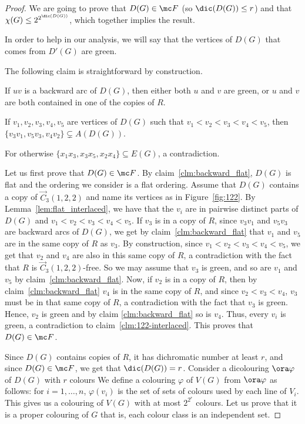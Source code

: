 \begin{proof}
We are going to prove that $D(G) \in \mc F$ (so $\dic(D(G)) \leq r$) and that $\chi(G) \leq 2^{2^{\dic(D(G))}}$, which together implies the result. 

In order to help in our analysis, we will say that the vertices of $D(G)$ that comes from $D'(G)$ are green. 

The following claim is straightforward by construction. 
\begin{claim}\label{clm:backward_flat}
If $uv$ is a backward arc of $D(G)$, then either both $u$ and $v$ are green, or $u$ and $v$ are both contained in one of the copies of $R$.
\end{claim}


\begin{claim}\label{clm:122-interlaced}
If $v_1, v_2, v_3, v_4, v_5$ are vertices of $D(G)$ such that $v_1 < v_2 < v_3 < v_4 < v_5$, then $\{v_3v_1, v_5v_3, v_4v_2\} \subsetneq A(D(G))$. 
\end{claim}
\begin{subproof}
For otherwise $\{x_1x_3, x_3x_5,x_2x_4\} \subseteq E(G)$, a contradiction. 
\end{subproof}

Let us first prove that $D(G) \in \mc F$. 
By claim~\ref{clm:backward_flat}, $D(G)$ is flat and the ordering we consider is a flat ordering. Assume that $D(G)$ contains a copy of $\vec C_{3}(1, 2, 2)$ and name its vertices as in Figure~\ref{fig:122}. 
By Lemma~\ref{lem:flat_interlaced}, we have that the $v_i$ are in pairwise distinct parts of $D(G)$ and $v_1 < v_2 < v_3 < v_4 < v_5$.  
If $v_{3}$ is in a copy of $R$, since $v_3v_{1}$ and $v_{5}v_3$ are backward arcs of $D(G)$, we get by claim~\ref{clm:backward_flat} that $v_1$ and $v_5$ are in the same copy of $R$ as $v_3$. By construction, since $v_1<v_2<v_3<v_4<v_5$, we get that $v_2$ and $v_4$ are also in this same copy of $R$, a contradiction with the fact that $R$ is $\vec C_{3}(1, 2, 2)$-free. 
So we may assume that $v_{3}$ is green, and so are $v_{1}$ and $v_{5}$ by claim~\ref{clm:backward_flat}. Now, if $v_2$ is in a copy of $R$, then by claim~\ref{clm:backward_flat} $v_4$ is in the same copy of $R$, and since $v_2 < v_3 < v_4$,   $v_3$ must be in that same copy of $R$, a contradiction with the fact that $v_3$ is green.
Hence, $v_2$ is green and by claim \ref{clm:backward_flat} so is $v_4$. Thus, every $v_i$ is green, a contradiction to claim~\ref{clm:122-interlaced}.
This proves that $D(G) \in \mc F$. 
\smallskip

Since  $D(G)$ contains copies of $R$, it has dichromatic number at least $r$, and since $D(G) \in \mc F$, we get that $\dic(D(G)) = r$.  
 Consider a dicolouring $\ora \varphi$ of $D(G)$ with $r$ colours 
We define a colouring $\varphi$ of $V(G)$ from $\ora \varphi$ as follows: for $i=1, \dots, n$, $\varphi(v_i)$ is the set of sets of colours used by each line of $V_i$. 
This gives us a colouring of $V(G)$ with at most $2^{2^r}$ colours. Let us prove that it is a proper colouring of $G$ that is, each colour class is an independent set. 


\end{proof}
